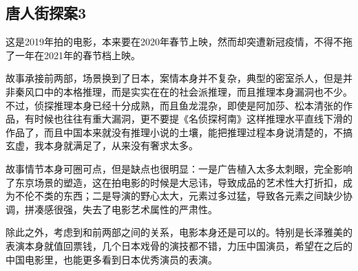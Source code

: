 \subsection{唐人街探案3}

这是2019年拍的电影，本来要在2020年春节上映，然而却突遭新冠疫情，不得不拖了一年在2021年的春节档上映。

故事承接前两部，场景换到了日本，案情本身并不复杂，典型的密室杀人，但是并非秦风口中的本格推理，而是实实在在的社会派推理，而且推理本身漏洞也不少。不过，侦探推理本身已经十分成熟，而且鱼龙混杂，即使是阿加莎、松本清张的作品，有时候也往往有重大漏洞，更不要提《名侦探柯南》这样推理水平直线下滑的作品了，而且中国本来就没有推理小说的土壤，能把推理过程本身说清楚的，不搞玄虚，我本身就满足了，从来没有奢求太多。

故事情节本身可圈可点，但是缺点也很明显：一是广告植入太多太刺眼，完全影响了东京场景的塑造，这在拍电影的时候是大忌讳，导致成品的艺术性大打折扣，成为不伦不类的东西；二是导演的野心太大，元素过多过猛，导致各元素之间缺少协调，拼凑感很强，失去了电影艺术属性的严肃性。

除此之外，考虑到和前两部之间的关系，电影本身还是可以的。特别是长泽雅美的表演本身就值回票钱，几个日本戏骨的演技都不错，力压中国演员，希望在之后的中国电影里，也能更多看到日本优秀演员的表演。